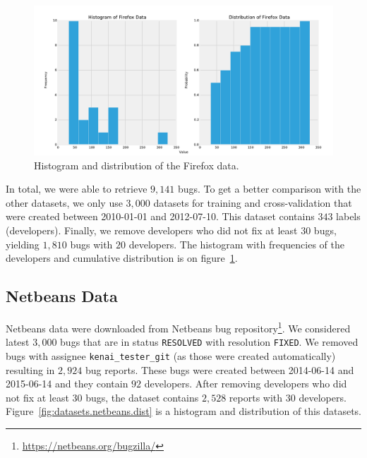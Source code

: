 \begin{figure}[htbp]
    \centering
        \includegraphics[width=\textwidth]{./images/distribution/firefox.pdf}
    \caption{Histogram and distribution of the Firefox data.}
    \label{fig:datasets.firefox.dist}
\end{figure}

In total, we were able to retrieve $9,141$ bugs. To get a better comparison with the other datasets, we only use $3,000$ datasets for training and cross-validation that were created between 2010-01-01 and 2012-07-10. This dataset contains $343$ labels (developers). Finally, we remove developers who did not fix at least $30$ bugs, yielding $1,810$ bugs with $20$ developers. The histogram with frequencies of the developers and cumulative distribution is on figure~\ref{fig:datasets.firefox.dist}.

\subsection{Netbeans Data}

Netbeans data were downloaded from Netbeans bug repository\footnote{\url{https://netbeans.org/bugzilla/}}. We considered latest $3,000$ bugs that are in status \texttt{RESOLVED} with resolution \texttt{FIXED}. We removed bugs with assignee \texttt{kenai\_tester\_git} (as those were created automatically) resulting in $2,924$ bug reports. These bugs were created between 2014-06-14 and 2015-06-14 and they contain $92$ developers. After removing developers who did not fix at least 30 bugs, the dataset contains $2,528$ reports with $30$ developers. Figure~\ref{fig:datasets.netbeans.dist} is a histogram and distribution of this datasets.

